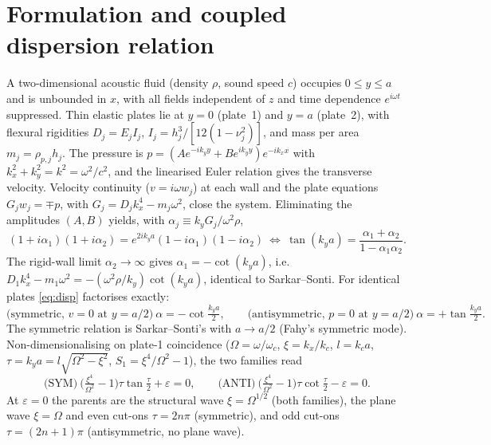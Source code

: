 \documentclass[11pt]{article}
\newcommand{\Om}{\Omega}
\newcommand{\eps}{\varepsilon}
\begin{document}
\section{Formulation and coupled dispersion relation}
A two-dimensional acoustic fluid (density $\rho$, sound speed $c$) occupies $0\le y\le a$ and is
unbounded in $x$, with all fields independent of $z$ and time dependence $e^{i\omega t}$ suppressed.
Thin elastic plates lie at $y=0$ (plate~1) and $y=a$ (plate~2), with flexural rigidities
$D_j=E_jI_j$, $I_j=h_j^3/[12(1-\nu_j^2)]$, and mass per area $m_j=\rho_{p,j}h_j$. The pressure is
$p=(A e^{-ik_yy}+Be^{ik_yy})e^{-ik_xx}$ with $k_x^2+k_y^2=k^2=\omega^2/c^2$, and the linearised Euler
relation gives the transverse velocity. Velocity continuity ($v=i\omega w_j$) at each wall and the
plate equations $G_jw_j=\mp p$, with $G_j=D_jk_x^4-m_j\omega^2$, close the system. Eliminating the
amplitudes $(A,B)$ yields, with $\alpha_j\equiv k_yG_j/\omega^2\rho$,
\begin{equation}
(1+i\alpha_1)(1+i\alpha_2)=e^{2ik_ya}(1-i\alpha_1)(1-i\alpha_2)
\ \Longleftrightarrow\
\tan(k_ya)=\frac{\alpha_1+\alpha_2}{1-\alpha_1\alpha_2}.
\label{eq:disp}
\end{equation}
The rigid-wall limit $\alpha_2\to\infty$ gives $\alpha_1=-\cot(k_ya)$, i.e.\
$D_1k_x^4-m_1\omega^2=-(\omega^2\rho/k_y)\cot(k_ya)$, identical to Sarkar--Sonti. For identical plates
\eqref{eq:disp} factorises exactly:
\begin{equation}
\text{(symmetric, $v{=}0$ at $y{=}a/2$)}\ \alpha=-\cot\tfrac{k_ya}{2},
\qquad
\text{(antisymmetric, $p{=}0$ at $y{=}a/2$)}\ \alpha=+\tan\tfrac{k_ya}{2}.
\end{equation}
The symmetric relation is Sarkar--Sonti's with $a\to a/2$ (Fahy's symmetric mode). Non-dimensionalising
on plate-1 coincidence ($\Om=\omega/\omega_c$, $\xi=k_x/k_c$, $l=k_ca$, $\tau=k_ya=l\sqrt{\Om^2-\xi^2}$,
$S_1=\xi^4/\Om^2-1$), the two families read
\begin{equation}
\text{(SYM)}\ \Big(\tfrac{\xi^4}{\Om^2}-1\Big)\tau\tan\tfrac{\tau}{2}+\eps=0,
\qquad
\text{(ANTI)}\ \Big(\tfrac{\xi^4}{\Om^2}-1\Big)\tau\cot\tfrac{\tau}{2}-\eps=0 .
\label{eq:nd}
\end{equation}
At $\eps=0$ the parents are the structural wave $\xi=\Om^{1/2}$ (both families), the plane wave
$\xi=\Om$ and even cut-ons $\tau=2n\pi$ (symmetric), and odd cut-ons $\tau=(2n{+}1)\pi$
(antisymmetric, no plane wave).
\end{document}
